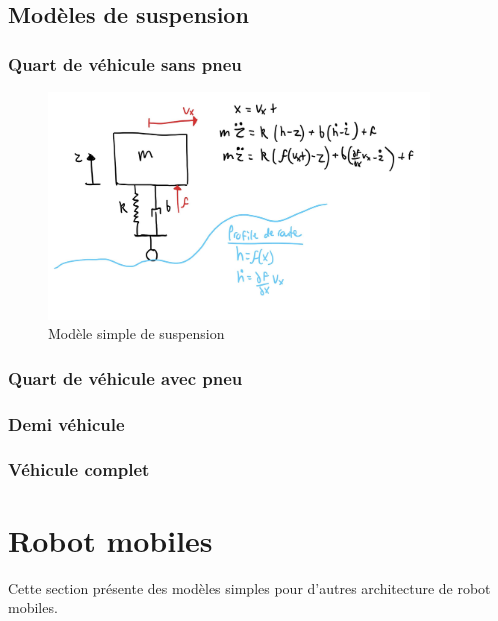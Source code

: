 \subsection{Modèles de suspension}

\subsubsection{Quart de véhicule sans pneu}

\begin{figure}[htbp]
	\centering
		\includegraphics[width=0.90\textwidth]{fig/simplesuspension.jpg}
	\caption{Modèle simple de suspension}
	\label{fig:simplesuspension}
\end{figure}

\subsubsection{Quart de véhicule avec pneu}

\subsubsection{Demi véhicule}

\subsubsection{Véhicule complet}


\newpage
\section{Robot mobiles}

Cette section présente des modèles simples pour d'autres architecture de robot mobiles.





